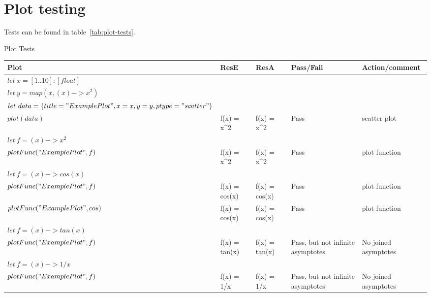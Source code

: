 \section{Plot testing}\label{sec:plot-testing}

Tests can be found in table~\ref{tab:plot-tests}.

\caption{Plot Tests}
\begin{tabular}{|p{1.8in}|p{0.5in}|p{0.4in}|p{0.6in}|p{1.4in}|} \hline
Plot & ResE & ResA& Pass/Fail & Action/comment \\ \hline \hline
$let\ x = [1..10] : [float]$ & & & & \\
$let\ y = map(x, (x) -> x^2)$ & & & & \\
$let\ data = \{ title = "Example Plot", x = x, y = y, ptype = "scatter" \}$ & & & & \\
$plot(data)$ & f(x) = x^2 & f(x) = x^2 & Pass & scatter plot \\ \hline
$let\ f = (x) -> x^2$ & & & & \\
$plotFunc("Example Plot", f)$ & f(x) = x^2 & f(x) = x^2 & Pass & plot function \\ \hline
$let\ f = (x) -> cos(x)$ & & & & \\
$plotFunc("Example Plot", f)$ & f(x) = cos(x) & f(x) = cos(x) & Pass & plot function \\ \hline
$plotFunc("Example Plot", cos)$ & f(x) = cos(x) & f(x) = cos(x) & Pass & plot function \\ \hline
$let\ f = (x) -> tan(x)$ & & & & \\
$plotFunc("Example Plot", f)$ & f(x) = tan(x) & f(x) = tan(x) & Pass, but not infinite asymptotes & No joined asymptotes \\ \hline
$let\ f = (x) -> 1 / x$ & & & & \\
$plotFunc("Example Plot", f)$ & f(x) = 1/x & f(x) = 1/x & Pass, but not infinite asymptotes & No joined asymptotes \\ \hline
\end{tabular}
\label{tab:plot-tests}
